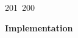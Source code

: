 201~200~\documentclass{article}
\begin{document}
\begin{itemize}
	                                                                                                                                                                                                                                                                                                	                                                                                                                                        	    	                                                                                                	                                                                                                                                                                                                                                                                                                                                	                                                                        	                                                                        	                                                                                                                                        	                                                                                                                                                                                                                        	                                                                                                \end{itemize}

	                                                                                                                                                                                                                                                                                                	                                                                                                                                        	    	                                                                                                	                                                                                                                                                                                                                                                                                                                                	                                                                        	                                                                        	                                                                                                                                        	                                                                                                                                                                                                                        	                                                                                                \textbf{Implementation}
\end{document}
